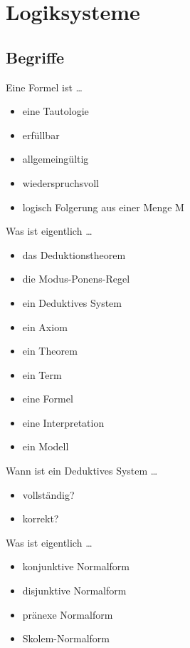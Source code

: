 \documentclass[a4paper]{article}
\title{\docTitle}
\author{Moritz}
\date{\today}
\begin{document}
\maketitle
\tableofcontents


\section{Logiksysteme}

\subsection{Begriffe}

Eine Formel ist \dots

\begin{itemize}
    \item eine Tautologie
    \item erfüllbar
    \item allgemeingültig
    \item wiederspruchsvoll
    \item logisch Folgerung aus einer Menge M
\end{itemize}

Was ist eigentlich \dots

\begin{itemize}
    \item das Deduktionstheorem
    \item die Modus-Ponens-Regel
    \item ein Deduktives System
    \item ein Axiom
    \item ein Theorem
    \item ein Term
    \item eine Formel
    \item eine Interpretation
    \item ein Modell
\end{itemize}

Wann ist ein Deduktives System \dots

\begin{itemize}
    \item vollständig?
    \item korrekt?
\end{itemize}

Was ist eigentlich \dots

\begin{itemize}
    \item konjunktive Normalform
    \item disjunktive Normalform
    \item pränexe Normalform
    \item Skolem-Normalform
\end{itemize}
\end{document}
